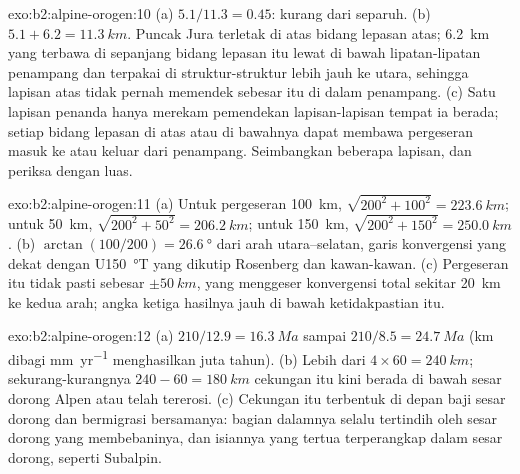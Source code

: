 \begin{solution}{exo:b2:alpine-orogen:10}
(a) $5.1/11.3 = 0.45$: kurang dari separuh. (b) $5.1 + 6.2 = \qty{11.3}{km}$. Puncak
Jura terletak di atas bidang lepasan atas; \qty{6.2}{km} yang terbawa di sepanjang bidang lepasan itu
lewat di bawah lipatan-lipatan penampang dan terpakai di struktur-struktur lebih jauh ke utara, sehingga
lapisan atas tidak pernah memendek sebesar itu di dalam penampang. (c) Satu lapisan penanda hanya merekam
pemendekan lapisan-lapisan tempat ia berada; setiap bidang lepasan di atas atau di bawahnya dapat
membawa pergeseran masuk ke atau keluar dari penampang. Seimbangkan beberapa lapisan, dan periksa dengan luas.
\end{solution}

\begin{solution}{exo:b2:alpine-orogen:11}
(a) Untuk pergeseran \qty{100}{km}, $\sqrt{200^2 + 100^2} = \qty{223.6}{km}$; untuk
\qty{50}{km}, $\sqrt{200^2 + 50^2} = \qty{206.2}{km}$; untuk \qty{150}{km},
$\sqrt{200^2 + 150^2} = \qty{250.0}{km}$. (b) $\arctan(100/200) = \qty{26.6}{\degree}$ dari
arah utara--selatan, garis konvergensi yang dekat dengan U\qty{150}{\degree}T yang dikutip Rosenberg dan
kawan-kawan. (c) Pergeseran itu tidak pasti sebesar $\pm\qty{50}{km}$, yang menggeser konvergensi
total sekitar \qty{20}{km} ke kedua arah; angka ketiga hasilnya jauh di bawah
ketidakpastian itu.
\end{solution}

\begin{solution}{exo:b2:alpine-orogen:12}
(a) $210/12.9 = \qty{16.3}{Ma}$ sampai $210/8.5 = \qty{24.7}{Ma}$ (\unit{km} dibagi
\unit{mm.yr^{-1}} menghasilkan juta tahun). (b) Lebih dari $4\times60 = \qty{240}{km}$; sekurang-kurangnya
$240 - 60 = \qty{180}{km}$ cekungan itu kini berada di bawah sesar dorong Alpen atau telah
tererosi. (c) Cekungan itu terbentuk di depan baji sesar dorong dan bermigrasi bersamanya: bagian
dalamnya selalu tertindih oleh sesar dorong yang membebaninya, dan isiannya yang tertua terperangkap
dalam sesar dorong, seperti  Subalpin.
\end{solution}

